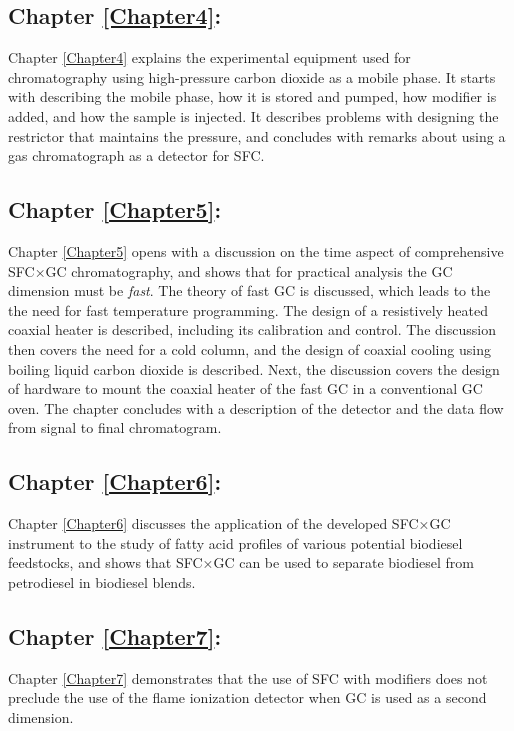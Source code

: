 \subsection{Chapter \ref{Chapter4}:  }

Chapter \ref{Chapter4} explains the experimental equipment used for
chromatography using high-pressure carbon dioxide as a mobile phase. It starts
with describing the mobile phase, how it is stored and pumped, how modifier is
added, and how the sample is injected. It describes problems with designing the
restrictor that maintains the pressure, and concludes with remarks about using a
gas chromatograph as a detector for SFC. 

\subsection{Chapter \ref{Chapter5}:  }

Chapter \ref{Chapter5} opens with a discussion on the time aspect of
comprehensive SFC×GC chromatography, and shows that for practical analysis the
GC dimension must be \textit{fast}. The theory of fast GC is discussed, which
leads to the the need for fast temperature programming. The design of a
resistively heated coaxial heater is described, including its calibration and
control. The discussion then covers the need for a cold column, and the design
of coaxial cooling using boiling liquid carbon dioxide is described. Next, the
discussion covers the design of hardware to mount the coaxial heater of the fast
GC in a conventional GC oven. The chapter concludes with a description of the
detector and the data flow from signal to final chromatogram.

\subsection{Chapter \ref{Chapter6}:  }

Chapter \ref{Chapter6} discusses the application of the developed SFC×GC
instrument to the study of fatty acid profiles of various potential biodiesel
feedstocks, and shows that SFC×GC can be used to separate biodiesel from
petrodiesel in biodiesel blends.

\subsection{Chapter \ref{Chapter7}:  }

Chapter \ref{Chapter7} demonstrates that the use of SFC with modifiers does not
preclude the use of the flame ionization detector when GC is used as a second
dimension.

